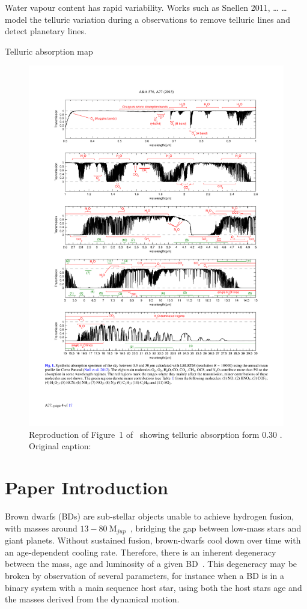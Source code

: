Water vapour content has rapid variability.
Works such as Snellen 2011, \ldots{} \ldots{}  model the telluric variation during a observations to remove telluric lines and detect planetary lines.



Telluric absorption map
\begin{figure}
    \centering
    \includegraphics[width=0.9\linewidth]{figures/advanced_material/cropped_molecfit_absorbtion}
    \caption{Reproduction of Figure~1 of~\citet{smette_molecfit_2015} showing telluric absorption form 0.30 \um. Original caption:}
    \label{fig:croppedmolecfitabsorbtion}
\end{figure}




\section{Paper Introduction}\label{sec:intro}
Brown dwarfs (BDs) are sub-stellar objects unable to achieve hydrogen fusion, with masses around \(13-80~\textrm{M}_{jup} \)~\citep{chabrier_theory_2000}, bridging the gap between low-mass stars and giant planets. Without sustained fusion, brown-dwarfs cool down over time with an age-dependent cooling rate. Therefore, there is an inherent degeneracy between the mass, age and luminosity of a given BD~\citep{burrows_nongray_1997}. This degeneracy may be broken by observation of several parameters, for instance when a BD is in a binary system with a main sequence host star, using both the host stars age and the masses derived from the dynamical motion.

